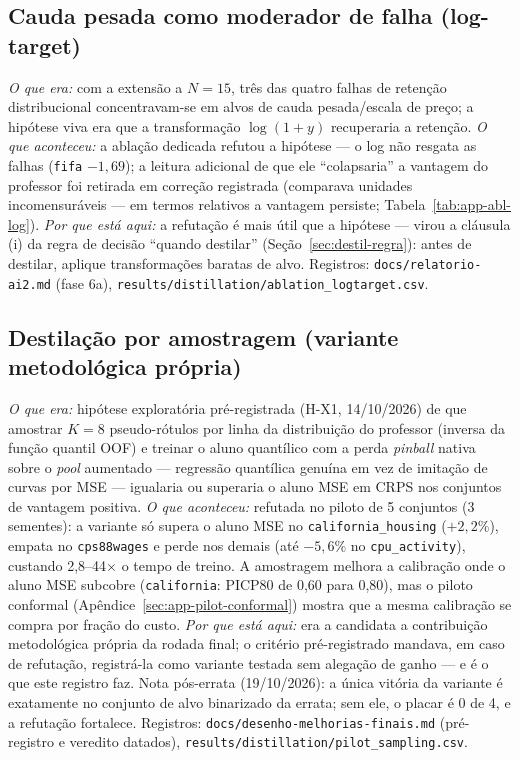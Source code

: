 \subsection{Cauda pesada como moderador de falha (log-target)}
\emph{O que era:} com a extensão a $N{=}15$, três das quatro falhas de
retenção distribucional concentravam-se em alvos de cauda
pesada/escala de preço; a hipótese viva era que a transformação
$\log(1+y)$ recuperaria a retenção. \emph{O que aconteceu:} a ablação
dedicada refutou a hipótese --- o log não resgata as falhas
(\texttt{fifa} $-1{,}69$); a leitura adicional de que ele
``colapsaria'' a vantagem do professor foi retirada em correção
registrada
(comparava unidades incomensuráveis --- em termos relativos a
vantagem persiste; Tabela~\ref{tab:app-abl-log}). \emph{Por que está aqui:} a refutação
é mais útil que a hipótese --- virou a cláusula (i) da regra de
decisão ``quando destilar'' (Seção~\ref{sec:destil-regra}): antes de
destilar, aplique transformações baratas de alvo. Registros:
\texttt{docs/\allowbreak relatorio-\allowbreak ai2.\allowbreak md} (fase 6a),
\texttt{results/\allowbreak distillation/\allowbreak ablation\_\allowbreak logtarget.\allowbreak csv}.

\subsection{Destilação por amostragem (variante metodológica própria)}
\emph{O que era:} hipótese exploratória pré-registrada (H-X1,
14/10/2026) de que amostrar $K{=}8$ pseudo-rótulos por linha da
distribuição do professor (inversa da função quantil OOF) e treinar o
aluno quantílico com a perda \emph{pinball} nativa sobre o \emph{pool}
aumentado --- regressão quantílica genuína em vez de imitação de
curvas por MSE --- igualaria ou superaria o aluno MSE em CRPS nos
conjuntos de vantagem positiva. \emph{O que aconteceu:} refutada no
piloto de 5 conjuntos (3 sementes): a variante só supera o aluno MSE
no \texttt{california\_\allowbreak housing} ($+2{,}2\%$), empata no
\texttt{cps88wages} e perde nos demais (até $-5{,}6\%$ no
\texttt{cpu\_activity}), custando 2,8--44$\times$ o tempo de treino. A
amostragem melhora a calibração onde o aluno MSE subcobre
(\texttt{california}: PICP80 de 0,60 para 0,80), mas o piloto conformal
(Apêndice~\ref{sec:app-pilot-conformal}) mostra que a mesma calibração
se compra por fração do custo. \emph{Por que está aqui:} era a
candidata a contribuição metodológica própria da rodada final; o
critério pré-registrado mandava, em caso de refutação, registrá-la
como variante testada sem alegação de ganho --- e é o que este registro faz. Nota
pós-errata (19/10/2026): a única vitória da variante é exatamente no
conjunto de alvo binarizado da errata; sem ele, o placar é 0 de 4, e a
refutação fortalece.
Registros: \texttt{docs/\allowbreak desenho-\allowbreak melhorias-\allowbreak finais.\allowbreak md} (pré-registro e
veredito datados), \texttt{results/\allowbreak distillation/\allowbreak pilot\_\allowbreak sampling.\allowbreak csv}.

